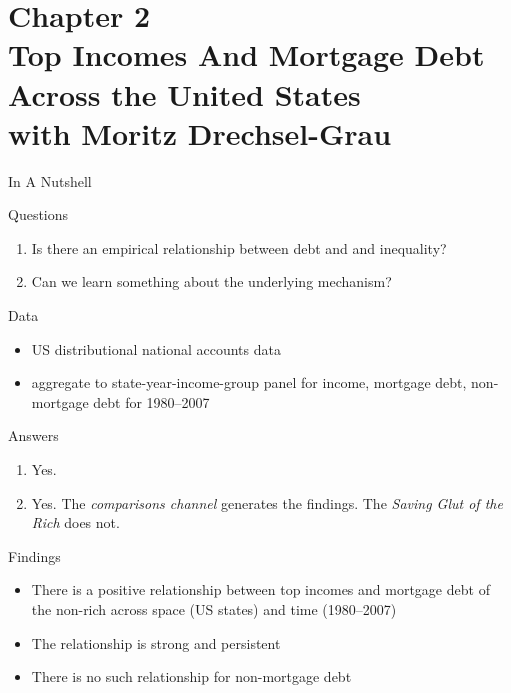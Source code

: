 \documentclass[aspectratio=169,mathserif,xcolor=dvipsnames]{beamer}
\begin{document}
 
 \section{Chapter 2 \\ Top Incomes And Mortgage Debt Across the United States \\ \footnotesize{with Moritz Drechsel-Grau}}

 \begin{frame}{In A Nutshell}

   \begin{block}{Questions}
     \begin{enumerate}
     \item Is there an empirical relationship between debt and and inequality?
     \item Can we learn something about the underlying mechanism?
     \end{enumerate}
   \end{block}
\pause
   \begin{block}{Data}
     \begin{itemize}
     \item US distributional national accounts data \citep{piketty2018dina}
     \item aggregate to state-year-income-group panel for income, mortgage debt, non-mortgage debt for 1980--2007
     \end{itemize}     
   \end{block}
\pause
   \begin{block}{Answers}
     \begin{enumerate}
     \item Yes.
     \item Yes. \pause The \emph{comparisons channel} generates the findings. The \emph{Saving Glut of the Rich} \citep{mian2020savingglutrich,kumhof2015ineq} does not.
     \end{enumerate}     
   \end{block}

 \end{frame}
 
  \begin{frame}{Findings}
     \begin{itemize}
     \item There is a positive relationship between top incomes and mortgage debt of the non-rich across space (US states) and time (1980--2007)
     \item The relationship is strong and persistent
     \item There is no such relationship for non-mortgage debt
     \end{itemize}

 \end{frame}
\end{document}

